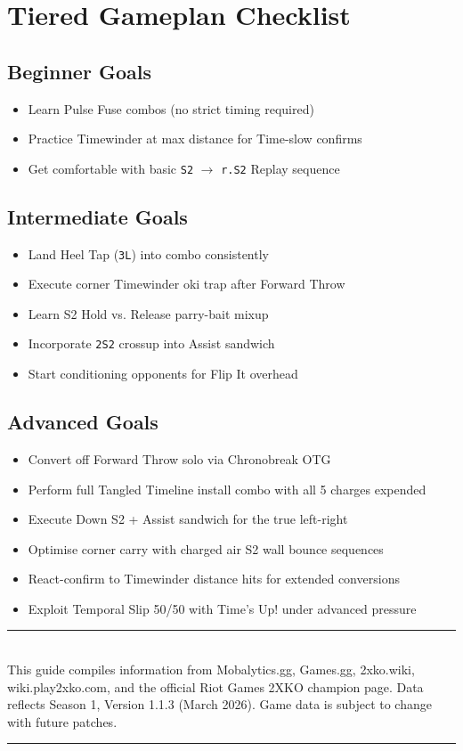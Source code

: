 \documentclass[12pt, a4paper]{report}
\newcommand{\notation}[1]{{\small\texttt{\textcolor{ekkoBlue}{#1}}}}
\begin{document}
\section{Tiered Gameplan Checklist}

\subsection*{Beginner Goals}
\begin{itemize}
  \item Learn Pulse Fuse combos (no strict timing required)
  \item Practice Timewinder at max distance for Time-slow confirms
  \item Get comfortable with basic \notation{S2} $\to$ \notation{r.S2} Replay sequence
\end{itemize}

\subsection*{Intermediate Goals}
\begin{itemize}
  \item Land Heel Tap (\notation{3L}) into combo consistently
  \item Execute corner Timewinder oki trap after Forward Throw
  \item Learn S2 Hold vs. Release parry-bait mixup
  \item Incorporate \notation{2S2} crossup into Assist sandwich
  \item Start conditioning opponents for Flip It overhead
\end{itemize}

\subsection*{Advanced Goals}
\begin{itemize}
  \item Convert off Forward Throw solo via Chronobreak OTG
  \item Perform full Tangled Timeline install combo with all 5 charges expended
  \item Execute Down S2 + Assist sandwich for the true left-right
  \item Optimise corner carry with charged air S2 wall bounce sequences
  \item React-confirm to Timewinder distance hits for extended conversions
  \item Exploit Temporal Slip 50/50 with Time's Up! under advanced pressure
\end{itemize}

\vfill
\begin{center}
\textcolor{ekkoPurple}{\rule{0.6\linewidth}{1pt}}\\[1em]
\textcolor{ekkoGray}{\small This guide compiles information from Mobalytics.gg, Games.gg, 2xko.wiki, wiki.play2xko.com, and the official Riot Games 2XKO champion page. Data reflects Season 1, Version 1.1.3 (March 2026). Game data is subject to change with future patches.}\\[0.5em]
\textcolor{ekkoPurple}{\rule{0.6\linewidth}{1pt}}
\end{center}
\end{document}
